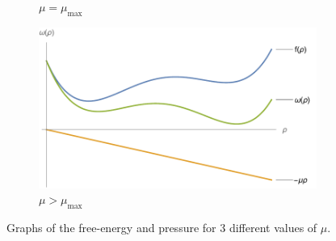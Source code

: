 \documentclass[10pt,a4paper]{book}
\begin{document}
\begin{figure}[h!]
\begin{subfigure}[b]{0.3\textwidth}
         \caption{$\mu = \mu_\text{max}$}
     \end{subfigure}
     \hfill
     \begin{subfigure}[b]{0.3\textwidth}
         \centering
         \includegraphics[width=\textwidth]{graphs/vision_with_constraint_3}
         \caption{$\mu > \mu_\text{max}$}
     \end{subfigure}
        \caption{Graphs of the free-energy and pressure for 3 different values of $\mu$.}
\end{figure}
\end{document}
